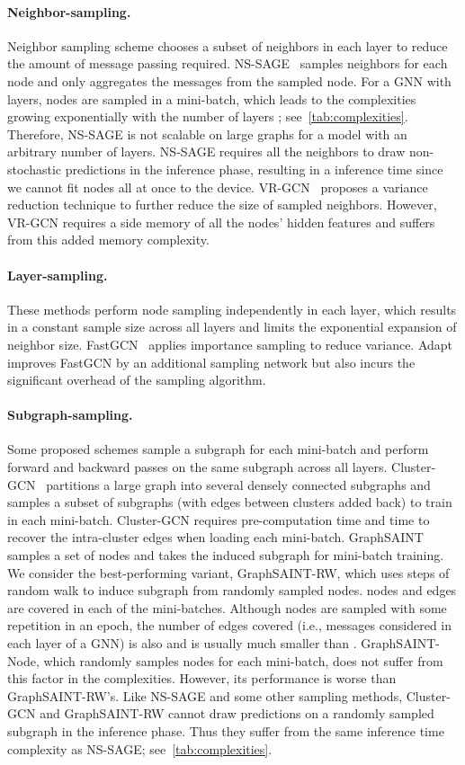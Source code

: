 \documentclass{article}
\newcommand{\cm}{\paragraph}
\begin{document}
\cm{Neighbor-sampling.} Neighbor sampling scheme chooses a subset of neighbors in each layer to reduce the amount of message passing required. NS-SAGE~\citep{hamilton2017inductive} samples  neighbors for each node and only aggregates the messages from the sampled node. For a GNN with  layers,  nodes are sampled in a mini-batch, which leads to the complexities growing exponentially with the number of layers ; see~\cref{tab:complexities}. Therefore, NS-SAGE is not scalable on large graphs for a model with an arbitrary number of layers. NS-SAGE requires all the neighbors to draw non-stochastic predictions in the inference phase, resulting in a  inference time since we cannot fit  nodes all at once to the device. VR-GCN~\citep{chen2018stochastic} proposes a variance reduction technique to further reduce the size  of sampled neighbors. However, VR-GCN requires a  side memory of all the nodes' hidden features and suffers from this added memory complexity.



\cm{Layer-sampling.} These methods perform node sampling independently in each layer, which results in a constant sample size across all layers and limits the exponential expansion of neighbor size. FastGCN~\citep{chen2018fastgcn} applies importance sampling to reduce variance. Adapt~\citep{huang2018adaptive} improves FastGCN by an additional sampling network but also incurs the significant overhead of the sampling algorithm.



\cm{Subgraph-sampling.} Some proposed schemes sample a subgraph for each mini-batch and perform forward and backward passes on the same subgraph across all layers. Cluster-GCN~\citep{chiang2019cluster} partitions a large graph into several densely connected subgraphs and samples a subset of subgraphs (with edges between clusters added back) to train in each mini-batch. Cluster-GCN requires  pre-computation time and  time to recover the intra-cluster edges when loading each mini-batch. GraphSAINT~\citep{zeng2019graphsaint} samples a set of nodes and takes the induced subgraph for mini-batch training. We consider the best-performing variant, GraphSAINT-RW, which uses  steps of random walk to induce subgraph from  randomly sampled nodes.  nodes and edges are covered in each of the  mini-batches. Although  nodes are sampled with some repetition in an epoch, the number of edges covered (i.e., messages considered in each layer of a GNN) is also  and is usually much smaller than . GraphSAINT-Node, which randomly samples nodes for each mini-batch, does not suffer from this  factor in the complexities. However, its performance is worse than GraphSAINT-RW's. Like NS-SAGE and some other sampling methods, Cluster-GCN and GraphSAINT-RW cannot draw predictions on a randomly sampled subgraph in the inference phase. Thus they suffer from the same  inference time complexity as NS-SAGE; see~\cref{tab:complexities}.
\end{document}
